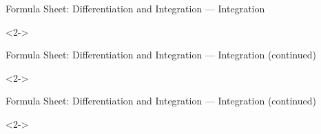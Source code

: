 \def\EMtitlesize{26}\def\EMtitleskip{31}
\begin{frame}{Formula Sheet: Differentiation and Integration — Integration}
\begin{uncoverenv}<2->
\vspace{3bp}
\vspace{3bp}
\vspace{3bp}
\end{uncoverenv}
\end{frame}

\def\EMtitlesize{26}\def\EMtitleskip{31}
\begin{frame}{Formula Sheet: Differentiation and Integration — Integration (continued)}
\begin{uncoverenv}<2->
\vspace{3bp}
\vspace{3bp}
\vspace{3bp}
\vspace{3bp}
\vspace{3bp}
\end{uncoverenv}
\end{frame}

\def\EMtitlesize{26}\def\EMtitleskip{31}
\begin{frame}{Formula Sheet: Differentiation and Integration — Integration (continued)}
\begin{uncoverenv}<2->
\vspace{3bp}
\vspace{3bp}
\vspace{3bp}
\end{uncoverenv}
\end{frame}


